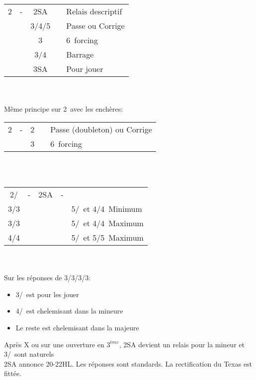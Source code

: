 \documentclass[a4paper, oneside, 11pt]{report}
\begin{document}
	\begin{tabular}{cccc|l}
	2\pique & - & 2SA && Relais descriptif\\
	&& 3\trefle/4\trefle/5\trefle && Passe ou Corrige\\
	&& 3\coeur && 6\coeur\ forcing\\
	&& 3\pique/4\pique && Barrage\\
	&& 3SA && Pour jouer\\
	\end{tabular}\\\\
	
	Même principe sur 2\coeur\ avec les enchères:
	\begin{tabular}{cccc|l}
	2\coeur & - & 2\pique && Passe (doubleton) ou Corrige\\
	&& 3\pique && 6\pique\ forcing\\
	\end{tabular}\\\\

	\begin{tabular}{cccc|l}
	2\coeur/\pique & - & 2SA & - &\\
	3\trefle/3\carreau &&&& 5\coeur/\pique\ et 4\trefle/4\carreau\ Minimum\\
	3\coeur/3\pique &&&& 5\coeur/\pique\ et 4\trefle/4\carreau\ Maximum\\
	4\trefle/4\carreau &&&& 5\coeur/\pique\ et 5\trefle/5\carreau\ Maximum\\
	\end{tabular}\\\\
	
	Sur les réponses de 3\trefle/3\carreau/3\coeur/3\pique:
	\begin{itemize}
	\item 3\coeur/\pique\ est pour les jouer
	\item 4\trefle/\carreau\ est chelemisant dans la mineure
	\item Le reste est chelemisant dans la majeure\\
	\end{itemize}
	
	Après X ou sur une ouverture en $3^{ème}$, 2SA devient un relais pour la mineur et 3\trefle/\carreau\ sont naturels\\

	2SA annonce 20-22HL. Les réponses sont standards. La rectification du Texas est fittée.\\
\end{document}
